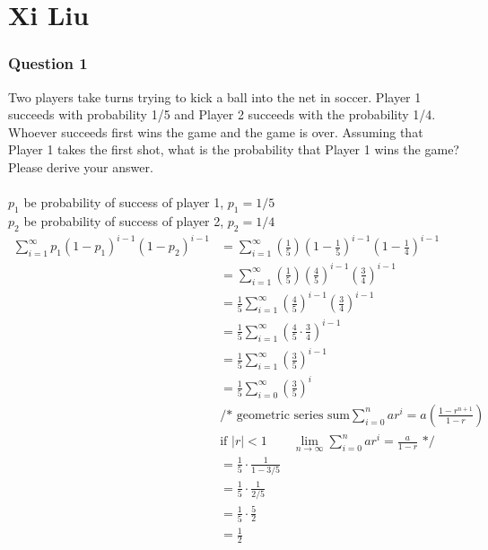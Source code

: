 \documentclass[12pt, border = 4pt, multi]{article} %
\begin{document}
\section*{Xi Liu}
\subsubsection*{Question 1}
Two players take turns trying to 
kick a ball into the net in soccer. 
Player 1 succeeds with probability 
1/5 and Player 2 succeeds with 
the probability 1/4. Whoever 
succeeds first wins the game 
and the game is over. 
Assuming that Player 1 takes the 
first shot, what is the 
probability that Player 1 wins 
the game? Please derive your 
answer.\\
\\
$p_1$ be probability of success of player 1, $p_1 = 1 / 5$\\
$p_2$ be probability of success of player 2, $p_2 = 1/ 4$\\
\begin{align*}
\sum_{i = 1} ^ {\infty} p_1 (1 - p_1) ^ {i - 1} (1 - p_2) ^ {i - 1}
&= \sum_{i = 1} ^ {\infty} \left(\frac{1}{5}\right) \left(1 - \frac{1}{5}\right) ^ {i - 1} \left(1 - \frac{1}{4}\right) ^ {i - 1}\\
&= \sum_{i = 1} ^ {\infty} \left(\frac{1}{5}\right) \left(\frac{4}{5}\right) ^ {i - 1} \left(\frac{3}{4}\right) ^ {i - 1}\\
&= \frac{1}{5} \sum_{i = 1} ^ {\infty} \left(\frac{4}{5}\right) ^ {i - 1} \left(\frac{3}{4}\right) ^ {i - 1}\\
&= \frac{1}{5} \sum_{i = 1} ^ {\infty}\left(\frac{4}{5}\cdot\frac{3}{4}\right) ^ {i - 1}\\
&= \frac{1}{5} \sum_{i = 1} ^ {\infty}\left(\frac{3}{5}\right) ^ {i - 1}\\
&= \frac{1}{5} \sum_{i = 0} ^ {\infty}\left(\frac{3}{5}\right) ^ i\\
&\text{/* geometric series sum} \sum_{i = 0} ^ n ar ^ i = a\left(\frac{1 - r ^ {n + 1}}{1 - r}\right)\\
&\text{if } |r| < 1 \qquad \lim_{n \rightarrow \infty} \sum_{i = 0} ^ n ar ^ i = \frac{a}{1 - r}\text{ */}\\
&= \frac{1}{5} \cdot \frac{1}{1 - 3 / 5}\\
&= \frac{1}{5} \cdot \frac{1}{2 / 5}\\
&= \frac{1}{5} \cdot \frac{5}{2}\\
&= \boxed{\frac{1}{2}}
\end{align*}
\newpage
\noindent
\end{document}
